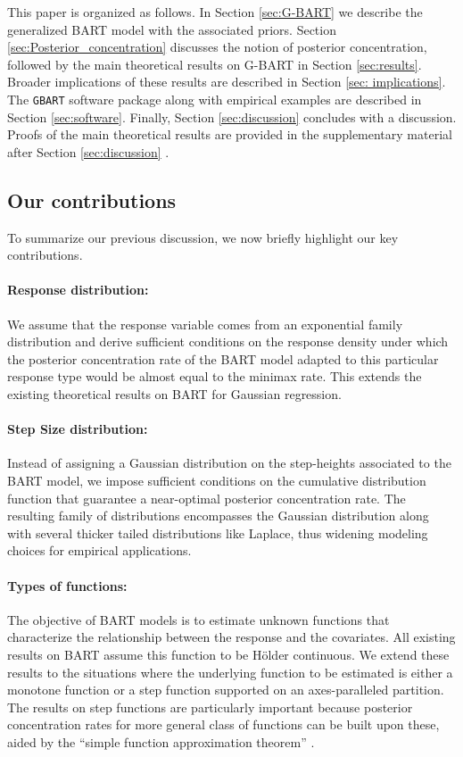 \documentclass[12pt]{article}
\newcommand{\1}{\mathbb{I}}
\theoremstyle{plain}
\theoremstyle{definition}
\theoremstyle{remark}
\begin{document}
This paper is organized as follows. In Section \ref{sec:G-BART} we describe the generalized BART model with the associated priors. Section \ref{sec:Posterior_concentration} discusses the notion of posterior concentration, followed by the main theoretical results on G-BART in Section \ref{sec:results}. Broader implications of these results are described in Section \ref{sec: implications}. The \texttt{GBART} software package along with empirical examples are described in Section \ref{sec:software}. Finally, Section \ref{sec:discussion} concludes with a discussion. Proofs of the main theoretical results are provided in the supplementary material after Section \ref{sec:discussion} .

\iffalse
\subsection{Our contributions}
To summarize our previous discussion, we now briefly highlight our key contributions.

\paragraph{Response distribution:} We assume that the response variable comes from an exponential family distribution and derive sufficient conditions on the response density under which the posterior concentration rate of the BART model adapted to this particular response type would be almost equal to the minimax rate. This extends the existing theoretical results on BART for Gaussian regression.
\paragraph{Step Size distribution:} Instead of assigning a Gaussian distribution on the step-heights associated to the BART model, we impose sufficient conditions on the cumulative distribution function that guarantee a near-optimal posterior concentration rate. The resulting family of distributions encompasses the Gaussian distribution along with several thicker tailed distributions like Laplace, thus widening modeling choices for empirical applications.
\paragraph{Types of functions:} The objective of BART models is to estimate unknown functions that characterize the relationship between the response and the covariates. All existing results on BART assume this function to be H\"older continuous. We extend these results to the situations where the underlying function to be estimated is either a monotone function or a step function supported on an axes-paralleled partition. The results on step functions are particularly important because posterior concentration rates for more general class of functions can be built upon these, aided by the ``simple function approximation theorem'' \citep{stein2009real}.
\end{document}
